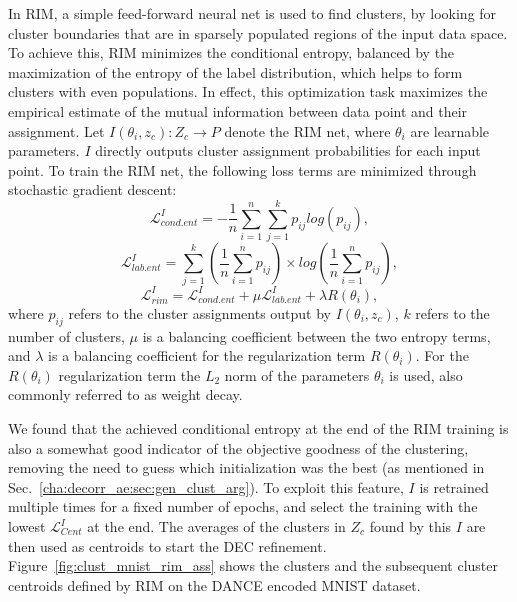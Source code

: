 			In \ac{RIM}, a simple feed-forward neural net is used to find clusters, by looking for cluster boundaries that are in sparsely populated regions of the input data space.
			To achieve this, \ac{RIM} minimizes the conditional entropy, balanced by the maximization of the entropy of the label distribution, which helps to form clusters with even populations.
			In effect, this optimization task maximizes the empirical estimate of the mutual information between data point and their assignment.
			Let $I(\theta_i, z_c) : Z_c \rightarrow P$ denote the \ac{RIM} net, where $\theta_i$ are learnable parameters.
			$I$ directly outputs cluster assignment probabilities for each input point.
			To train the \ac{RIM} net, the following loss terms are minimized through stochastic gradient descent:
			\begin{equation}
				\label{eq:l_i_Cent}
				\mathcal{L}^I_{cond.ent} = -\frac{1}{n} \sum_{i=1}^{n} \sum_{j=1}^{k} p_{ij}log(p_{ij}),
			\end{equation}
			\begin{equation}
				\label{eq:l_i_Lent}
				\mathcal{L}^I_{lab.ent} = \sum_{j=1}^{k} ( \frac{1}{n} \sum_{i=1}^{n} p_{ij} ) \times log(\frac{1}{n} \sum_{i=1}^{n} p_{ij}),
			\end{equation}
			\begin{equation}
				\label{eq:l_i_rim}
				\mathcal{L}^I_{rim} = \mathcal{L}^I_{cond.ent} + \mu\mathcal{L}^I_{lab.ent} + \lambda R(\theta_i),
			\end{equation}
			\noindent where $p_{ij}$ refers to the cluster assignments output by $I(\theta_i, z_c)$, $k$ refers to the number of clusters, $\mu$ is a balancing coefficient between the two entropy terms, and $\lambda$ is a balancing coefficient for the regularization term $R(\theta_i)$.		
			For the $R(\theta_i)$ regularization term the $L_2$ norm of the parameters $\theta_i$ is used, also commonly referred to as weight decay.
			
			We found that the achieved conditional entropy at the end of the \ac{RIM} training is also a somewhat good indicator of the objective goodness of the clustering, removing the need to guess which initialization was the best (as mentioned in Sec.~\ref{cha:decorr_ae:sec:gen_clust_arg}).
			To exploit this feature, $I$ is retrained multiple times for a fixed number of epochs, and select the training with the lowest $\mathcal{L}^I_{Cent}$ at the end.
			The averages of the clusters in $Z_c$ found by this $I$ are then used as centroids to start the \ac{DEC} refinement.
			Figure~\ref{fig:clust_mnist_rim_ass} shows the clusters and the subsequent cluster centroids defined by \ac{RIM} on the \ac{DANCE} encoded MNIST dataset.
			
